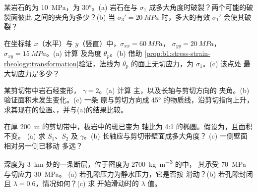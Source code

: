 \begin{exercise}[$\star$]\label{exo:b1:stress-strain-rheology:4}
某岩石的为 \qty{10}{MPa}，为
\ang{30}。(a) 岩石在与 $\sigma_1$ 成多大角度时破裂？两个可能的破裂面彼此
之间的夹角为多少？(b) 当
$\sigma_3' = \qty{20}{MPa}$ 时，多大的有效 $\sigma_1'$ 会使其破裂？
\end{exercise}

\begin{exercise}[$\star\star$]\label{exo:b1:stress-strain-rheology:5}
在坐标轴 $x$（水平）与 $y$（竖直）中，$\sigma_{xx} = \qty{60}{MPa}$，
$\sigma_{yy} = \qty{20}{MPa}$，$\sigma_{xy} = \qty{15}{MPa}$。(a) 计算
及角度 $\theta_p$。(b) 借助
\cref{prop:b1:stress-strain-rheology:transformation}验证，法线为
$\theta_p$ 的面上无切应力，为 $\sigma_1$。(c) 该点处
最大切应力是多少？
\end{exercise}

\begin{exercise}[$\star\star$]\label{exo:b1:stress-strain-rheology:6}
某剪切带中岩石经变形， $\gamma = 2$。(a) 计算
主，以及长轴与剪切方向的
夹角。(b) 验证面积未发生变化。(c) 一条
原与剪切方向成 \ang{45} 的物质线，沿剪切指向上升，
求其现在的位置、，并与(a)的结果比较。
\end{exercise}

\begin{exercise}[$\star\star$]\label{exo:b1:stress-strain-rheology:7}
在厚 \qty{200}{m} 的剪切带中，板岩中的斑已变为
轴比为 4:1 的椭圆。假设为，且面积不变。
(a) 求 $S_1$、$S_2$ 及 $\gamma$。(b) 长轴应与剪切带壁面成多大角度？
(c) 一侧壁面相对另一侧已移动
多远？
\end{exercise}

\begin{exercise}[$\star\star$]\label{exo:b1:stress-strain-rheology:8}
深度为 \qty{3}{km} 处的一条断层，位于密度为 \qty{2700}{kg.m^{-3}} 的中，
其承受 \qty{70}{MPa} 与切应力 \qty{30}{MPa}。
(a) 若孔隙压力为静水压力，它是否按
滑动？(b) 若孔隙封闭且 $\lambda = 0.6$，情况如何？(c) 求
开始滑动时的 $\lambda$ 值。
\end{exercise}

